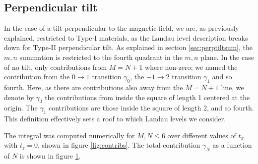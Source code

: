\subsection{Perpendicular tilt}
In the case of a tilt perpendicular to the magnetic field, we are, as previously explained, restricted to Type-I materials, as the Landau level description breaks down for Type-II perpendicular tilt.
As explained in section \ref{sec:perptiltsum}, the \( m,n \) summation is restricted to the fourth quadrant in the \( m,n \) plane.
In the case of no tilt, only contributions from \( M = N + 1 \) where non-zero;
we named the contribution from the \( 0\to 1 \) transition \( \gamma_0 \), the \( -1\to 2 \) transition \( \gamma_1 \) and so fourth.
Here, as there are contributions also away from the \( M=N + 1 \) line, we denote by \( \gamma_0 \) the contributions from inside the square of length 1 centered at the origin.
The \( \gamma_1 \) contributions are those inside the square of length 2, and so fourth.
This definition effectively sets a roof to which Landau levels we consider.

The integral was computed numerically for \( M,N \leq 6 \) over different values of \( t_x \) with \( t_z = 0 \), shown in figure \ref{fig:contribs}.
The total contribution \( \gamma_N \) as a function of \( N \) is shown in figure \ref{fig:total_contribs}.

\begin{figure}[ht]
  \centering
  \caption{\label{fig:total_contribs} }
\end{figure}


